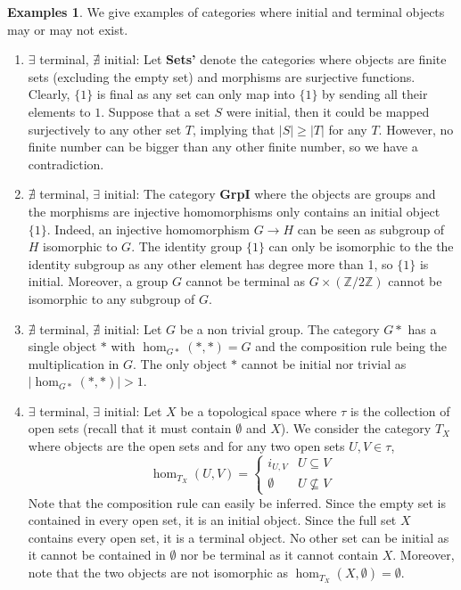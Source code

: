 \documentclass{scrartcl}
\theoremstyle{definition}
\newtheorem{exmps}[thm]{Examples}
\theoremstyle{remark}
\newcommand{\Z}{\mathbb{Z}}
\begin{document}
\begin{exmps}
    We give examples of categories where initial and terminal objects may or may not exist.
    \begin{enumerate}
        \item $\exists$ terminal, $\nexists$ initial: Let \textbf{Sets'} denote the categories where objects are finite sets (excluding the empty set) and morphisms are surjective functions. Clearly, $\{1\}$ is final as any set can only map into $\{1\}$ by sending all their elements to $1$. Suppose that a set $S$ were initial, then it could be mapped surjectively to any other set $T$, implying that $|S| \geq |T|$ for any $T$. However, no finite number can be bigger than any other finite number, so we have a contradiction.
        \item  $\nexists$ terminal, $\exists$ initial: The category \textbf{GrpI} where the objects are groups and the morphisms are injective homomorphisms only contains an initial object $\{1\}$. Indeed, an injective homomorphism $G \rightarrow H$ can be seen as subgroup of $H$ isomorphic to $G$. The identity group $\{1\}$ can only be isomorphic to the the identity subgroup as any other element has degree more than 1, so $\{1\}$ is initial. Moreover, a group $G$ cannot be terminal as $G \times (\Z/2\Z)$ cannot be isomorphic to any subgroup of $G$.
        \item $\nexists$ terminal, $\nexists$ initial: Let $G$ be a non trivial group. The category $G*$ has a single object $*$ with $\hom_{G*}(*, *) = G$ and the composition rule being the multiplication in $G$. The only object $*$ cannot be initial nor trivial as $|\hom_{G*}(*,*)| > 1$.
        \item $\exists$ terminal, $\exists$ initial: Let $X$ be a topological space where $\tau$ is the collection of open sets (recall that it must contain $\emptyset$ and $X$). We consider the category $T_X$ where objects are the open sets and for any two open sets $U, V \in \tau$, 
    	\[\hom_{T_X}(U,V) = \begin{cases}i_{U,V} & U \subseteq V\\ \emptyset & U \not\subseteq V\end{cases}\]
    	Note that the composition rule can easily be inferred. Since the empty set is contained in every open set, it is an initial object. Since the full set $X$ contains every open set, it is a terminal object. No other set can be initial as it cannot be contained in $\emptyset$ nor be terminal as it cannot contain $X$. Moreover, note that the two objects are  not isomorphic as $\hom_{T_X}(X, \emptyset) = \emptyset$.
    \end{enumerate}
    
\end{exmps}
\end{document}
